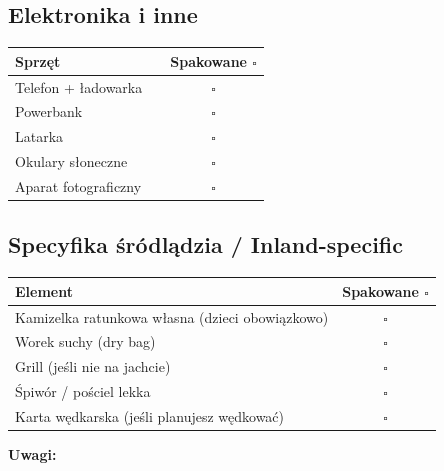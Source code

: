 \documentclass[a4paper,11pt]{article}
\begin{document}
\vspace{0.3cm}

\subsection*{Elektronika i inne}
\begin{tabularx}{\linewidth}{|X|c|c|}
\hline
\textbf{Sprzęt} & & \textbf{Spakowane \(\square\)} \\
\hline
Telefon + ładowarka & & \(\square\) \\[4pt]\hline
Powerbank & & \(\square\) \\[4pt]\hline
Latarka & & \(\square\) \\[4pt]\hline
Okulary słoneczne & & \(\square\) \\[4pt]\hline
Aparat fotograficzny & & \(\square\) \\[4pt]\hline
\end{tabularx}

\vspace{0.3cm}

\subsection*{Specyfika śródlądzia / Inland-specific}
\begin{tabularx}{\linewidth}{|X|c|}
\hline
\textbf{Element} & \textbf{Spakowane \(\square\)} \\
\hline
Kamizelka ratunkowa własna (dzieci obowiązkowo) & \(\square\) \\[4pt]\hline
Worek suchy (dry bag) & \(\square\) \\[4pt]\hline
Grill (jeśli nie na jachcie) & \(\square\) \\[4pt]\hline
Śpiwór / pościel lekka & \(\square\) \\[4pt]\hline
Karta wędkarska (jeśli planujesz wędkować) & \(\square\) \\[4pt]\hline
\end{tabularx}

\vspace{0.4cm}
\noindent\textbf{Uwagi:}
\begin{tabularx}{\linewidth}{|X|}
\hline
\\[2cm]
\hline
\end{tabularx}
\end{document}
